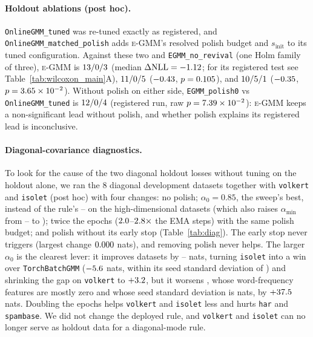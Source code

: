 \documentclass[10pt]{article} %
\newcommand{\egmm}{\textsc{e-GMM}}
\begin{document}
\paragraph{Holdout ablations (post hoc).} \texttt{OnlineGMM\_tuned} was re-tuned exactly as registered, and \texttt{OnlineGMM\_matched\_polish} adds \egmm{}'s resolved polish budget and $s_{\mathrm{init}}$ to its tuned configuration. Against these two and \texttt{EGMM\_no\_revival} (one Holm family of three), \egmm{} is $13/0/3$ (median $\Delta\mathrm{NLL} = -1.12$; for its registered test see Table~\ref{tab:wilcoxon_main}A), $11/0/5$ ($-0.43$, $p = 0.105$), and $10/5/1$ ($-0.35$, $p = 3.65\times 10^{-2}$). Without polish on either side, \texttt{EGMM\_polish0} vs \texttt{OnlineGMM\_tuned} is $12/0/4$ (registered run, raw $p = 7.39\times 10^{-2}$): \egmm{} keeps a non-significant lead without polish, and whether polish explains its registered lead is inconclusive.

\paragraph{Diagonal-covariance diagnostics.} To look for the cause of the two diagonal holdout losses without tuning on the holdout alone, we ran the 8 diagonal development datasets together with \texttt{volkert} and \texttt{isolet} (post hoc) with four changes: no polish; $\alpha_0 = 0.85$, the sweep's best, instead of the rule's \rXDiagAlphaLo--\rXDiagAlphaHi{} on the high-dimensional datasets (which also raises $\alpha_{\min}$ from \rXDiagAminLo--\rXDiagAminHi{} to \rXDiagAminAlt); twice the epochs ($2.0$--$2.8\times$ the EMA steps) with the same polish budget; and polish without its early stop (Table~\ref{tab:diag}). The early stop never triggers (largest change $0.000$ nats), and removing polish never helps. The larger $\alpha_0$ is the clearest lever: it improves \rXDiagAImproved{} datasets by \rXDiagAImpMin--\rXDiagAImpMax{} nats, turning \texttt{isolet} into a win over \texttt{TorchBatchGMM} ($-5.6$ nats, within its seed standard deviation of \rXDiagIsoletSD) and shrinking the gap on \texttt{volkert} to $+3.2$, but it worsens \texttt{\rXDiagAWorstName}, whose word-frequency features are mostly zero and whose seed standard deviation is \rXDiagWorstSeedSD{} nats, by $+37.5$ nats. Doubling the epochs helps \texttt{volkert} and \texttt{isolet} less and hurts \texttt{har} and \texttt{spambase}. We did not change the deployed rule, and \texttt{volkert} and \texttt{isolet} can no longer serve as holdout data for a diagonal-mode rule.
\end{document}
